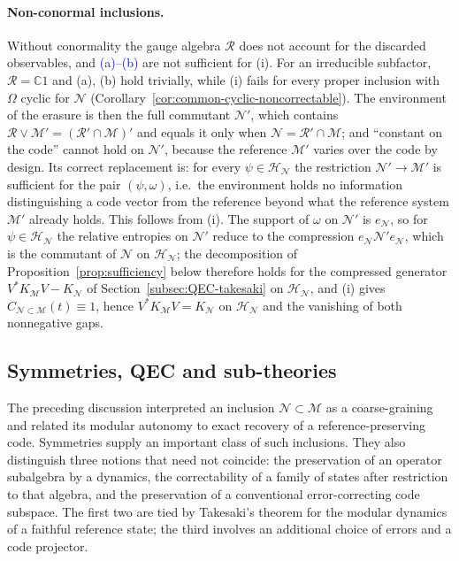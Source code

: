 \documentclass[a4paper,11pt]{article}
\theoremstyle{definition}
\newcommand{\mR}{\mathcal{R}}
\newcommand{\mN}{\mathcal{N}}
\newcommand{\mH}{\mathcal{H}}
\newcommand{\mM}{\mathcal{M}}
\newcommand{\NL}[1]{\textcolor{blue}{#1}}
\begin{document}
\paragraph{Non-conormal inclusions.}
Without conormality the gauge algebra $\mR$ does not account for the discarded observables, and \NL{(a)--(b)} are not sufficient for (i). For an irreducible subfactor, $\mR=\mathbb C1$ and (a), (b) hold trivially, while (i) fails for every proper inclusion with $\Omega$ cyclic for $\mN$ (Corollary~\ref{cor:common-cyclic-noncorrectable}). The environment of the erasure is then the full commutant $\mN'$, which contains $\mR\vee\mM'=(\mR'\cap\mM)'$ and equals it only when $\mN=\mR'\cap\mM$; and ``constant on the code'' cannot hold on $\mN'$, because the reference $\mM'$ varies over the code by design. Its correct replacement is: for every $\psi\in\mH_{\mN}$ the restriction $\mN'\to\mM'$ is sufficient for the pair $(\psi,\omega)$, i.e.\ the environment holds no information distinguishing a code vector from the reference beyond what the reference system $\mM'$ already holds. This follows from (i). The support of $\omega$ on $\mN'$ is $e_{\mN}$, so for $\psi\in\mH_{\mN}$ the relative entropies on $\mN'$ reduce to the compression $e_{\mN}\mN'e_{\mN}$, which is the commutant of $\mN$ on $\mH_{\mN}$; the decomposition of Proposition~\ref{prop:sufficiency} below therefore holds for the compressed generator $V^*K_{\mM}V-K_{\mN}$ of Section~\ref{subsec:QEC-takesaki} on $\mH_{\mN}$, and (i) gives $C_{\mN\subset\mM}(t)\equiv1$, hence $V^*K_{\mM}V=K_{\mN}$ on $\mH_{\mN}$ and the vanishing of both nonnegative gaps.

\subsection{Symmetries, QEC and sub-theories}\label{subsec:symmetries-QEC-subtheories}

The preceding discussion interpreted an inclusion $\mN\subset\mM$ as a
coarse-graining and related its modular autonomy to exact recovery of a
reference-preserving code. Symmetries supply an important class of such
inclusions. They also distinguish three notions that need not coincide:
the preservation of an operator subalgebra by a dynamics, the correctability
of a family of states after restriction to that algebra, and the preservation
of a conventional error-correcting code subspace. The first two are tied by
Takesaki's theorem for the modular dynamics of a faithful reference state;
the third involves an additional choice of errors and a code projector.
\end{document}
